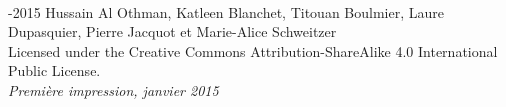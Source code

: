 ~\vfill
\thispagestyle{empty}

\noindent {}-2015 Hussain Al Othman, Katleen Blanchet, Titouan Boulmier, Laure Dupasquier, Pierre Jacquot et Marie-Alice Schweitzer\\ %



\noindent Licensed under the Creative Commons Attribution-ShareAlike 4.0 International Public License.\\ %

\noindent \textit{Première impression, janvier 2015} %